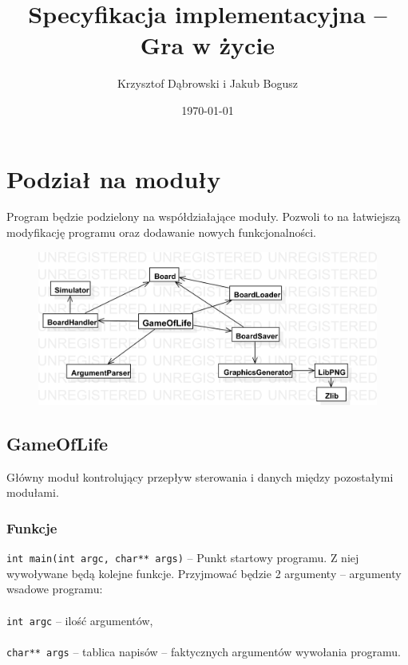 \documentclass{article}
\title{Specyfikacja implementacyjna -- Gra w życie}
\author{Krzysztof Dąbrowski i Jakub Bogusz}
\date{\today}
\begin{document}
\maketitle{}

\tableofcontents{}

\section{Podział na moduły}
Program będzie podzielony na współdziałające moduły. Pozwoli to na łatwiejszą modyfikację programu oraz dodawanie nowych funkcjonalności.

\begin{figure}
	\centering
	\def\svgwidth{\columnwidth}
	\includegraphics[width=13cm]{diagram_modolow.png}
\end{figure}	

\subsection{GameOfLife}
Główny moduł kontrolujący przepływ sterowania i danych między pozostałymi modułami.

\subsubsection{Funkcje}
\texttt{int main(int argc, char** args)} -- Punkt startowy programu. Z niej wywoływane będą kolejne funkcje. Przyjmować będzie 2 argumenty -- argumenty wsadowe programu:\\\\
	 \hspace*{10mm}\texttt{int argc} -- ilość argumentów,\\\\
	 \hspace*{10mm}\texttt{char** args} -- tablica napisów -- faktycznych argumentów wywołania	 \hspace*{34mm} programu.\\
\end{document}
